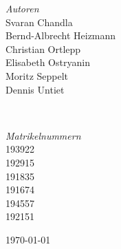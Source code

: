 \documentclass{article}
\begin{document}
\begin{titlepage}
	\begin{minipage}{0.4\textwidth}
		\begin{flushright}
			\large
			\textit{Autoren}\\
			{Svaran Chandla }\\
			{Bernd-Albrecht Heizmann }\\
			{Christian Ortlepp} \\
			{Elisabeth Ostryanin} \\
			Moritz Seppelt \\
			Dennis Untiet
		\end{flushright}
	\end{minipage}
	~
	\begin{minipage}{0.4\textwidth}
		\begin{flushleft}
			\large
			\textit{Matrikelnummern}\\
			193922\\
			192915\\
			191835\\
			191674\\
			194557\\
			192151\\
		\end{flushleft}
	\end{minipage}



	\vfill%

	{\large\today} %


	\vfill

\end{titlepage}




\tableofcontents
\newpage






\end{document}
